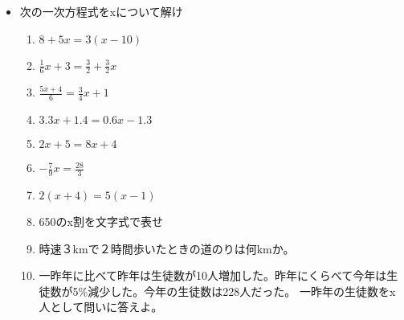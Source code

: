 \documentclass[a4paper,fleqn,papersize,15pt]{jsarticle}
\begin{document}
 \begin{itemize}
   \item 次の一次方程式をxについて解け
   \begin{enumerate}
\item $8+5x=3(x-10)$ \begin{flushright}\framebox[8em]{\rule{0pt}{6ex}}\end{flushright} %
\item $\frac{1}{6}x+3= \frac{3}{2} + \frac{3}{2} x$ \begin{flushright}\framebox[8em]{\rule{0pt}{6ex}}\end{flushright} %
\item $\frac{5x+4}{6} = \frac{3}{4}x+1$ \begin{flushright}\framebox[8em]{\rule{0pt}{6ex}}\end{flushright} %
\item $3.3x+1.4=0.6x-1.3$ \begin{flushright}\framebox[8em]{\rule{0pt}{6ex}}\end{flushright} %
\item $2x+5=8x+4$ \begin{flushright}\framebox[8em]{\rule{0pt}{6ex}}\end{flushright} %
\item $- \frac{7}{9} x= \frac{28}{3}$ \begin{flushright}\framebox[8em]{\rule{0pt}{6ex}}\end{flushright} %
\item $2(x+4)=5(x-1)$ \begin{flushright}\framebox[8em]{\rule{0pt}{6ex}}\end{flushright} %
\item 650のx割を文字式で表せ \vfill \begin{flushright}\framebox[8em]{\rule{0pt}{6ex}}\end{flushright} %
\item 時速３kmで２時間歩いたときの道のりは何kmか。 \vfill \begin{flushright}\framebox[8em]{\rule{0pt}{6ex}}\end{flushright} %
\item 一昨年に比べて昨年は生徒数が10人増加した。昨年にくらべて今年は生徒数が5\%減少した。今年の生徒数は228人だった。 一昨年の生徒数をx人として問いに答えよ。 \vfill \begin{flushright}\framebox[8em]{\rule{0pt}{6ex}}\end{flushright} %
\begin{enumerate}

\end{enumerate}
\end{enumerate}
\end{itemize}
\end{document}
